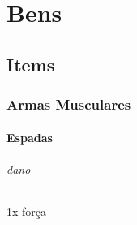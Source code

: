 
\part{Bens}
\chapter{Items}
\section{Armas Musculares}
\subsection{Espadas}
\paragraph{dano} 1x força
%
%
%
%
%
%
%
